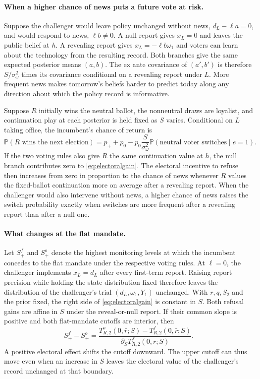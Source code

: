 \documentclass[11pt,letterpaper]{article}
\newcommand{\Prb}{\mathbb P}
\begin{document}
\paragraph{When a higher chance of news puts a future vote at risk.}
Suppose the challenger would leave policy unchanged without news, $d_L-\ell a=0$, and would respond to news, $\ell b\ne0$. A null report gives $x_L=0$ and leaves the public belief at $h$. A revealing report gives $x_L=-\ell b\omega_1$ and voters can learn about the technology from the resulting record. Both branches give the same expected posterior means $(a,b)$. The ex ante covariance of $(a',b')$ is therefore $S/\sigma_\omega^2$ times its covariance conditional on a revealing report under $L$. More frequent news makes tomorrow's beliefs harder to predict today along any direction about which the policy record is informative.

Suppose $R$ initially wins the neutral ballot, the nonneutral draws are loyalist, and continuation play at each posterior is held fixed as $S$ varies. Conditional on $L$ taking office, the incumbent's chance of return is
\[
 \Prb(R\text{ wins the next election})
 =p_++p_0-p_0\frac{S}{\sigma_\omega^2}
   \Prb(\text{neutral voter switches}\mid e=1).
\]
If the two voting rules also give $R$ the same continuation value at $h$, the null branch contributes zero to \eqref{eq:electoralgain}. The electoral incentive to refuse then increases from zero in proportion to the chance of news whenever $R$ values the fixed-ballot continuation more on average after a revealing report. When the challenger would also intervene without news, a higher chance of news raises the switch probability exactly when switches are more frequent after a revealing report than after a null one.

\paragraph{What changes at the flat mandate.}
Let $S_+^f$ and $S_+^o$ denote the highest monitoring levels at which the incumbent concedes to the flat mandate under the respective voting rules. At $\ell=0$, the challenger implements $x_L=d_L$ after every first-term report. Raising report precision while holding the state distribution fixed therefore leaves the distribution of the challenger's trial $(d_L,\omega_1,Y_1)$ unchanged. With $r,q,S_2$ and the prior fixed, the right side of \eqref{eq:electoralgain} is constant in $S$. Both refusal gains are affine in $S$ under the reveal-or-null report. If their common slope is positive and both flat-mandate cutoffs are interior, then
\begin{equation}
 S_+^f-S_+^o =
 \frac{T_{R,2}^o(0,\bar r;S)-T_{R,2}^f(0,\bar r;S)}
 {\partial_S T_{R,2}^f(0,\bar r;S)} .
 \label{eq:cutoffshift}
\end{equation}
A positive electoral effect shifts the cutoff downward. The upper cutoff can thus move even when an increase in $S$ leaves the electoral value of the challenger's record unchanged at that boundary.
\end{document}
